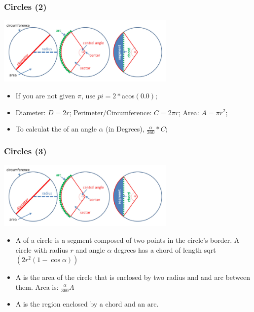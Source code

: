 \documentclass{beamer}
\begin{document}
\begin{frame}
  \frametitle{Circles (2)}
  {\smaller

    \begin{center}
      \includegraphics[width=0.65\textwidth]{../img/circle_halim}
    \end{center}

    \begin{itemize}
      \item If you are not given $\pi$, use $pi = 2*$acos$(0.0)$;
      \item Diameter: $D=2r$; Perimeter/Circumference: $C=2\pi r$; Area: $A=\pi r^2$;
      \item To calculat the  of an angle $\alpha$ (in Degrees), $\frac{\alpha}{360}*C$;
    \end{itemize}
  }
\end{frame}

\begin{frame}
  \frametitle{Circles (3)}
  {\smaller
    \begin{center}
      \includegraphics[width=0.65\textwidth]{../img/circle_halim}
    \end{center}
  
  \begin{itemize}
  \item A  of a circle is a segment composed of two points in the circle's border. A circle with radius $r$ and angle $\alpha$ degrees has a chord of length sqrt$(2r^2(1-\cos{\alpha}))$
  \item A  is the area of the circle that is enclosed by two radius and and arc between them. Area is: $\frac{\alpha}{360}A$
  \item A  is the region enclosed by a chord and an arc.

  \end{itemize}
  }
\end{frame}
\end{document}
